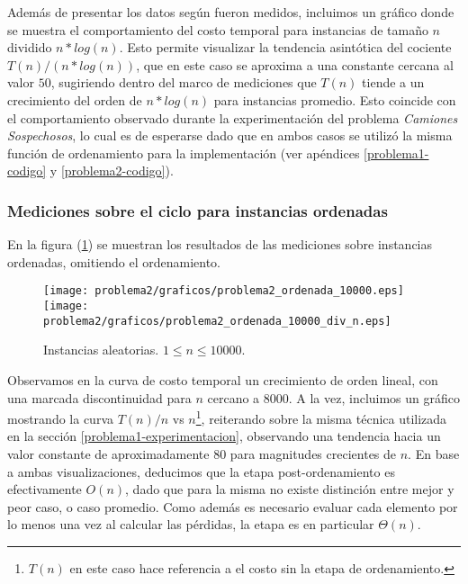 Además de presentar los datos según fueron medidos, incluimos un gráfico donde se muestra el comportamiento del costo temporal para instancias de tamaño $n$ dividido $n * log(n)$. Esto permite visualizar la tendencia asintótica del cociente $T(n) / (n * log(n))$, que en este caso se aproxima a una constante cercana al valor $50$, sugiriendo dentro del marco de mediciones que $T(n)$ tiende a un crecimiento del orden de $n * log(n)$ para instancias promedio. Esto coincide con el comportamiento observado durante la experimentación del problema \emph{Camiones Sospechosos}, lo cual es de esperarse dado que en ambos casos se utilizó la misma función de ordenamiento para la implementación (ver apéndices \ref{problema1-codigo} y \ref{problema2-codigo}).

\subsubsection{Mediciones sobre el ciclo para instancias ordenadas}

En la figura (\ref{fig:problema2-ciclo}) se muestran los resultados de las mediciones sobre instancias ordenadas, omitiendo el ordenamiento.

\begin{center}
  \begin{figure}[H]
    \texttt{[image: problema2/graficos/problema2\_ordenada\_10000.eps]}
    \texttt{[image: problema2/graficos/problema2\_ordenada\_10000\_div\_n.eps]}
  \caption{Instancias aleatorias. $1 \leq n \leq 10000$.}
  \label{fig:problema2-ciclo}
  \end{figure}
\end{center}

Observamos en la curva de costo temporal un crecimiento de orden lineal, con una marcada discontinuidad para $n$ cercano a $8000$. A la vez, incluimos un gráfico mostrando la curva $T(n) / n$ vs $n$\footnote{$T(n)$ en este caso hace referencia a el costo sin la etapa de ordenamiento.}, reiterando sobre la misma técnica utilizada en la sección \ref{problema1-experimentacion}, observando una tendencia hacia un valor constante de aproximadamente $80$ para magnitudes crecientes de $n$. En base a ambas visualizaciones, deducimos que la etapa post-ordenamiento es efectivamente $O(n)$, dado que para la misma no existe distinción entre mejor y peor caso, o caso promedio. Como además es necesario evaluar cada elemento por lo menos una vez al calcular las pérdidas, la etapa es en particular $\Theta(n)$.

